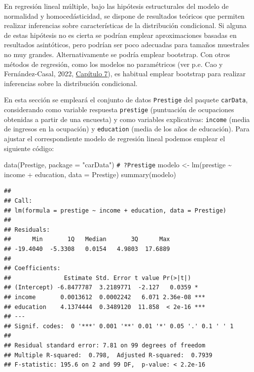 \documentclass[
]{book}
\newenvironment{Shaded}{\begin{snugshade}}{\end{snugshade}}
\newcommand{\AttributeTok}[1]{\textcolor[rgb]{0.77,0.63,0.00}{#1}}
\newcommand{\CommentTok}[1]{\textcolor[rgb]{0.56,0.35,0.01}{\textit{#1}}}
\newcommand{\FunctionTok}[1]{\textcolor[rgb]{0.00,0.00,0.00}{#1}}
\newcommand{\NormalTok}[1]{#1}
\newcommand{\OtherTok}[1]{\textcolor[rgb]{0.56,0.35,0.01}{#1}}
\newcommand{\SpecialCharTok}[1]{\textcolor[rgb]{0.00,0.00,0.00}{#1}}
\newcommand{\StringTok}[1]{\textcolor[rgb]{0.31,0.60,0.02}{#1}}
\theoremstyle{break}
\theoremstyle{nonumberplain}
\renewcommand{\CommentTok}[1]{\textcolor[rgb]{0.41,0.41,0.41}{\texttt{#1}}}
\begin{document}
En regresión lineal múltiple, bajo las hipótesis estructurales del modelo de normalidad y homocedásticidad, se dispone de resultados teóricos que permiten realizar inferencias sobre características de la distribución condicional. Si alguna de estas hipótesis no es cierta se podrían emplear aproximaciones basadas en resultados asintóticos, pero podrían ser poco adecuadas para tamaños muestrales no muy grandes. Alternativamente se podría emplear bootstrap.
Con otros métodos de regresión, como los modelos no paramétricos (ver p.e. Cao y Fernández-Casal, 2022, \href{https://rubenfcasal.github.io/book_remuestreo/m\%C3\%A9todos-de-remuestreo-en-regresi\%C3\%B3n-no-param\%C3\%A9trica.html}{Capítulo 7}), es habitual emplear bootstrap para realizar inferencias sobre la distribución condicional.

En esta sección se empleará el conjunto de datos \texttt{Prestige} del paquete \texttt{carData}, considerando como variable respuesta \texttt{prestige} (puntuación de ocupaciones obtenidas a partir de una encuesta) y como variables explicativas: \texttt{income} (media de ingresos en la ocupación) y \texttt{education} (media de los años de educación).
Para ajustar el correspondiente modelo de regresión lineal podemos emplear el siguiente código:

\begin{Shaded}
\begin{Highlighting}[]
\FunctionTok{data}\NormalTok{(Prestige, }\AttributeTok{package =} \StringTok{"carData"}\NormalTok{)}
\CommentTok{\# ?Prestige}
\NormalTok{modelo }\OtherTok{\textless{}{-}} \FunctionTok{lm}\NormalTok{(prestige }\SpecialCharTok{\textasciitilde{}}\NormalTok{ income }\SpecialCharTok{+}\NormalTok{ education, }\AttributeTok{data =}\NormalTok{ Prestige)}
\FunctionTok{summary}\NormalTok{(modelo)}
\end{Highlighting}
\end{Shaded}

\begin{verbatim}
## 
## Call:
## lm(formula = prestige ~ income + education, data = Prestige)
## 
## Residuals:
##      Min       1Q   Median       3Q      Max 
## -19.4040  -5.3308   0.0154   4.9803  17.6889 
## 
## Coefficients:
##               Estimate Std. Error t value Pr(>|t|)    
## (Intercept) -6.8477787  3.2189771  -2.127   0.0359 *  
## income       0.0013612  0.0002242   6.071 2.36e-08 ***
## education    4.1374444  0.3489120  11.858  < 2e-16 ***
## ---
## Signif. codes:  0 '***' 0.001 '**' 0.01 '*' 0.05 '.' 0.1 ' ' 1
## 
## Residual standard error: 7.81 on 99 degrees of freedom
## Multiple R-squared:  0.798,  Adjusted R-squared:  0.7939 
## F-statistic: 195.6 on 2 and 99 DF,  p-value: < 2.2e-16
\end{verbatim}
\end{document}
